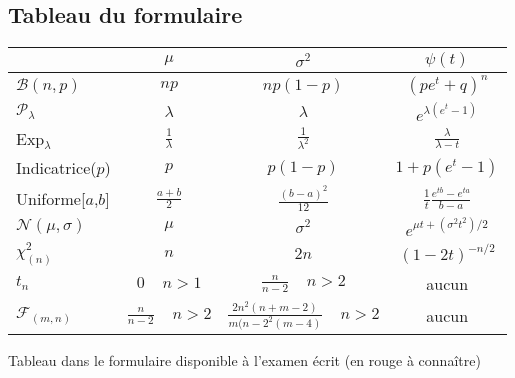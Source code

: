 \subsection{Tableau du formulaire}

\newcommand{\important}[1]{\textcolor[rgb]{1,0,0}{#1}} %

\begin{center}
	\begin{tabular}{|l|c|c|c|}
		\hline
				& $\mu$                           & $\sigma^2$                                      & $\psi(t)$\\
		\hline
		$\mathcal{B}(n,p)$        & \important{$np$}                & \important{$np(1-p)$}                           & $(pe^t+q)^n$\\
		\hline
		$\mathcal{P}_\lambda$     & \important{$\lambda$}           & \important{$\lambda$}                           & $e^{\lambda(e^t-1)}$\\
		\hline
		Exp$_\lambda$             & \important{$\frac{1}{\lambda}$} & $\frac{1}{\lambda^2}$                           & $\frac{\lambda}{\lambda-t}$\\
		\hline
		Indicatrice($p$)          & \important{$p$}                 & \important{$p(1-p)$}                            & $1+p(e^t-1)$\\
		\hline
		Uniforme[$a$,$b$]         & \important{$\frac{a+b}{2}$}     & $\frac{(b-a)^2}{12}$                            & $\frac{1}{t}\frac{e^{tb}-e^{ta}}{b-a}$\\
		\hline
		$\mathcal{N}(\mu,\sigma)$ & \important{$\mu$}               & \important{$\sigma^2$}                          & $e^{\mu t+(\sigma^2t^2)/2}$\\
		\hline
		$\chi^2_{(n)}$            & \important{$n$}                 & $2n$                                            & $(1-2t)^{-n/2}$\\
		\hline
		$t_n$                     & \important{$0\ \ \ \ \ n>1$}    & $\frac{n}{n-2}\ \ \ \ \ n>2$                    & \important{aucun}\\
		\hline
		$\mathcal{F}_{(m,n)}$     & $\frac{n}{n-2}\ \ \ \ \ n>2$    & $\frac{2n^2(n+m-2)}{m(n-2^2(m-4)}\ \ \ \ \ n>2$ & \important{aucun}\\
		\hline
	\end{tabular}

	Tableau dans le formulaire disponible à l'examen écrit (\important{en rouge à connaître})
\end{center}



